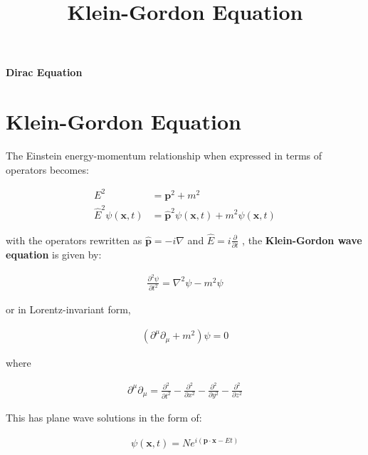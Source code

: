 \documentclass[10pt]{article}
\theoremstyle{definition}
\begin{document}
\setcounter{section}{1}
\title{Klein-Gordon Equation}

\pagestyle{fancy}
\fancyhf{}
\setlength{\headheight}{12.0pt}

\begin{center}
{\LARGE \bf Dirac Equation}\\
\end{center}

\section*{Klein-Gordon Equation}%

The Einstein energy-momentum relationship when expressed in terms of operators becomes:

\begin{align*}
    E^2 &= \mathbf{p}^2 + m^2\\
    \hat{E}^2\psi(\mathbf{x},t) &= \hat{\mathbf{p}}^2\psi(\mathbf{x},t) + m^2\psi(\mathbf{x},t)
\end{align*}

with the operators rewritten as $\hat{\mathbf{p}} = -i\nabla$ and $\hat{E} = i\frac{\partial}{\partial t}$ , the \textbf{Klein-Gordon wave equation} is given by:

\begin{align}
    \frac{\partial^2\psi}{\partial t^2} = \nabla^2\psi - m^2\psi
\end{align}

or in Lorentz-invariant form,

\begin{align}
    (\partial^{\mu}\partial_{\mu} + m^2)\psi = 0
\end{align}

where

\begin{align*}
    \partial^{\mu}\partial_{\mu} = \frac{\partial^2}{\partial t^2} - \frac{\partial^2}{\partial x^2} - \frac{\partial^2}{\partial y^2} - \frac{\partial^2}{\partial z^2}
\end{align*}

This has plane wave solutions in the form of:

\begin{align}
    \psi(\mathbf{x},t) = Ne^{i(\mathbf{p}\cdot\mathbf{x} - Et)}
\end{align}
\end{document}
